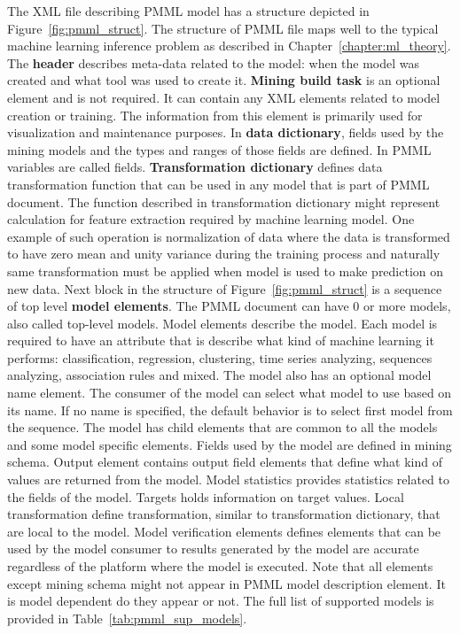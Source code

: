 \documentclass[english, 12pt, a4paper, elec, utf8, online]{aaltothesis}
\begin{document}
The XML file describing PMML model has a structure depicted in Figure~\ref{fig:pmml_struct}. The structure of PMML file maps well to the typical machine learning inference problem as described in Chapter~\ref{chapter:ml_theory}. The \textbf{header} describes meta-data related to the model: when the model was created and what tool was used to create it. \textbf{Mining build task} is an optional element and is not required. It can contain any XML elements related to model creation or training. The information from this element is primarily used for visualization and maintenance purposes.  In \textbf{data dictionary}, fields used by the mining models and the types and ranges of those fields are defined. In PMML variables are called fields. \textbf{Transformation dictionary} defines data transformation function that can be used in any model that is part of PMML document. The function described in transformation dictionary might represent calculation for feature extraction required by machine learning model. One example of such operation is normalization of data where the data is transformed to have zero mean and unity variance during the training process and naturally same transformation must be applied when model is used to make prediction on new data. Next block in the structure of Figure~\ref{fig:pmml_struct} is a sequence of top level \textbf{model elements}. The PMML document can have 0 or more models, also called top-level models.  Model elements describe the model. Each model is required to have an attribute that is describe what kind of machine learning it performs: classification, regression, clustering, time series analyzing, sequences analyzing, association rules and mixed. The model also has an optional model name element. The consumer of the model can select what model to use based on its name. If no name is specified, the default behavior is to select first model from the sequence. The model has child elements that are common to all the models and some model specific elements. Fields used by the model are defined in mining schema. Output element contains output field elements that define what kind of values are returned from the model. Model statistics provides statistics related to the fields of the model. Targets holds information on target values. Local transformation define transformation, similar to transformation dictionary, that are local to the model. Model verification elements defines elements that can be used by the model consumer to results generated by the model are accurate regardless of the platform where the model is executed. Note that all elements except mining schema might not appear in PMML model description element. It is model dependent do they appear or not. The full list of supported models is provided in Table~\ref{tab:pmml_sup_models}. 
\end{document}

